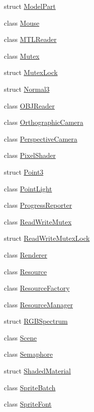 \begin{DoxyCompactItemize}
struct \hyperlink{structmage_1_1_model_part}{Model\+Part}
\item 
class \hyperlink{classmage_1_1_mouse}{Mouse}
\item 
class \hyperlink{classmage_1_1_m_t_l_reader}{M\+T\+L\+Reader}
\item 
class \hyperlink{classmage_1_1_mutex}{Mutex}
\item 
struct \hyperlink{structmage_1_1_mutex_lock}{Mutex\+Lock}
\item 
struct \hyperlink{structmage_1_1_normal3}{Normal3}
\item 
class \hyperlink{classmage_1_1_o_b_j_reader}{O\+B\+J\+Reader}
\item 
class \hyperlink{classmage_1_1_orthographic_camera}{Orthographic\+Camera}
\item 
class \hyperlink{classmage_1_1_perspective_camera}{Perspective\+Camera}
\item 
class \hyperlink{classmage_1_1_pixel_shader}{Pixel\+Shader}
\item 
struct \hyperlink{structmage_1_1_point3}{Point3}
\item 
class \hyperlink{classmage_1_1_point_light}{Point\+Light}
\item 
class \hyperlink{classmage_1_1_progress_reporter}{Progress\+Reporter}
\item 
class \hyperlink{classmage_1_1_read_write_mutex}{Read\+Write\+Mutex}
\item 
struct \hyperlink{structmage_1_1_read_write_mutex_lock}{Read\+Write\+Mutex\+Lock}
\item 
class \hyperlink{classmage_1_1_renderer}{Renderer}
\item 
class \hyperlink{classmage_1_1_resource}{Resource}
\item 
class \hyperlink{classmage_1_1_resource_factory}{Resource\+Factory}
\item 
class \hyperlink{classmage_1_1_resource_manager}{Resource\+Manager}
\item 
struct \hyperlink{structmage_1_1_r_g_b_spectrum}{R\+G\+B\+Spectrum}
\item 
class \hyperlink{classmage_1_1_scene}{Scene}
\item 
class \hyperlink{classmage_1_1_semaphore}{Semaphore}
\item 
struct \hyperlink{structmage_1_1_shaded_material}{Shaded\+Material}
\item 
class \hyperlink{classmage_1_1_sprite_batch}{Sprite\+Batch}
\item 
class \hyperlink{classmage_1_1_sprite_font}{Sprite\+Font}

\end{DoxyCompactItemize}
